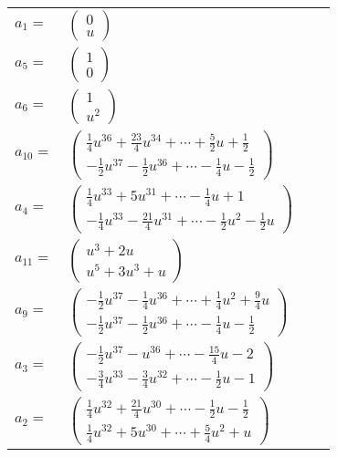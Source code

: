 \documentclass[1p]{elsarticle_modified}
\theoremstyle{definition}
\begin{document}
\begin{tabular}{m{7pt} m{180pt} m{7pt} m{180pt} }
\flushright $a_{1}=$&$\begin{pmatrix}0\\u\end{pmatrix}$ \\
\flushright $a_{5}=$&$\begin{pmatrix}1\\0\end{pmatrix}$ \\
\flushright $a_{6}=$&$\begin{pmatrix}1\\u^2\end{pmatrix}$ \\
\flushright $a_{10}=$&$\begin{pmatrix}\frac{1}{4} u^{36}+\frac{23}{4} u^{34}+\cdots+\frac{5}{2} u+\frac{1}{2}\\-\frac{1}{2} u^{37}-\frac{1}{2} u^{36}+\cdots-\frac{1}{4} u-\frac{1}{2}\end{pmatrix}$ \\
\flushright $a_{4}=$&$\begin{pmatrix}\frac{1}{4} u^{33}+5 u^{31}+\cdots-\frac{1}{4} u+1\\-\frac{1}{4} u^{33}-\frac{21}{4} u^{31}+\cdots-\frac{1}{2} u^2-\frac{1}{2} u\end{pmatrix}$ \\
\flushright $a_{11}=$&$\begin{pmatrix}u^3+2 u\\u^5+3 u^3+u\end{pmatrix}$ \\
\flushright $a_{9}=$&$\begin{pmatrix}-\frac{1}{2} u^{37}-\frac{1}{4} u^{36}+\cdots+\frac{1}{4} u^2+\frac{9}{4} u\\-\frac{1}{2} u^{37}-\frac{1}{2} u^{36}+\cdots-\frac{1}{4} u-\frac{1}{2}\end{pmatrix}$ \\
\flushright $a_{3}=$&$\begin{pmatrix}-\frac{1}{2} u^{37}- u^{36}+\cdots-\frac{15}{4} u-2\\-\frac{3}{4} u^{33}-\frac{3}{4} u^{32}+\cdots-\frac{1}{2} u-1\end{pmatrix}$ \\
\flushright $a_{2}=$&$\begin{pmatrix}\frac{1}{4} u^{32}+\frac{21}{4} u^{30}+\cdots-\frac{1}{2} u-\frac{1}{2}\\\frac{1}{4} u^{32}+5 u^{30}+\cdots+\frac{5}{4} u^2+u\end{pmatrix}$ \\

\end{tabular}
\end{document}
